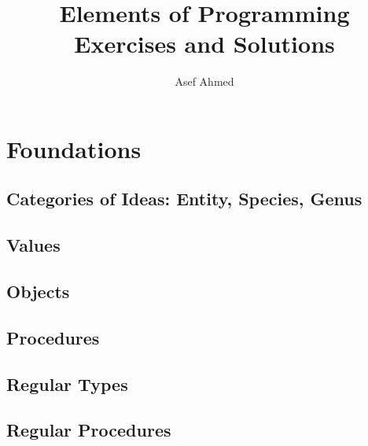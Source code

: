 





\title{Elements of Programming Exercises and Solutions}

\author{Asef Ahmed}



\maketitle

\section{Foundations}

\subsection{Categories of Ideas: Entity, Species, Genus}
\subsection{Values}

\subsection{Objects}
\subsection{Procedures}
\subsection{Regular Types}

\subsection{Regular Procedures}


    

